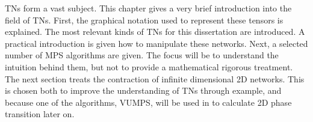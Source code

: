 \Glspl{TN} form a vast subject. This chapter gives a very brief introduction into the field of \Glspl{TN}. First, the graphical notation used to represent these tensors is explained. The most relevant kinds of \Glspl{TN} for this dissertation are introduced. A practical introduction is given how to manipulate these networks. Next, a selected number of \gls{MPS} algorithms are given. The focus will be to understand the intuition behind them, but not to  provide a mathematical rigorous treatment. The next section treats the contraction of infinite dimensional 2D networks. This is chosen both to improve the understanding of \Glspl{TN} through example, and because one of the algorithms, \gls{VUMPS}, will be used in to calculate 2D phase transition later on.